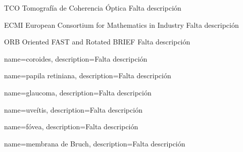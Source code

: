 
  {TCO}            %
  {Tomografía de Coherencia Óptica}  %
  {Falta descripción} %

  {ECMI}            %
  {European Consortium for Mathematics in Industry}  %
  {Falta descripción} %

  {ORB} %
  {Oriented FAST and Rotated BRIEF} %
  {Falta descripción} %

{
  name={coroides},
  description={Falta descripción}
}

{
  name={papila retiniana},
  description={Falta descripción}
}

{
  name={glaucoma},
  description={Falta descripción}
}

{
  name={uveítis},
  description={Falta descripción}
}

{
  name={fóvea},
  description={Falta descripción}
}

{
  name={membrana de Bruch},
  description={Falta descripción}
}